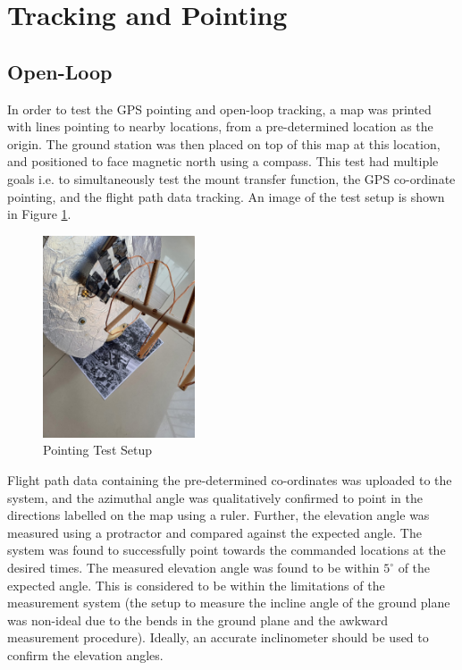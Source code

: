 \graphicspath{{./figures}}

\section{Tracking and Pointing}

\subsection{Open-Loop}

In order to test the GPS pointing and open-loop tracking, a map was printed with lines pointing to nearby locations, from a pre-determined location as the origin. The ground station was then placed on top of this map at this location, and positioned to face magnetic north using a compass. This test had multiple goals i.e. to simultaneously test the mount transfer function, the GPS co-ordinate pointing, and the flight path data tracking. An image of the test setup is shown in Figure \ref{fig:pointingTest}.

\begin{figure}[!htb]
  \centering
  \includegraphics[width=0.4\textwidth]{pointingTestSetup}
  \caption{Pointing Test Setup}
  \label{fig:pointingTest}
\end{figure}

Flight path data containing the pre-determined co-ordinates was uploaded to the system, and the azimuthal angle was qualitatively confirmed to point in the directions labelled on the map using a ruler. Further, the elevation angle was measured using a protractor and compared against the expected angle. The system was found to successfully point towards the commanded locations at the desired times. The measured elevation angle was found to be within $5^\circ$ of the expected angle. This is considered to be within the limitations of the measurement system (the setup to measure the incline angle of the ground plane was non-ideal due to the bends in the ground plane and the awkward measurement procedure). Ideally, an accurate inclinometer should be used to confirm the elevation angles.

